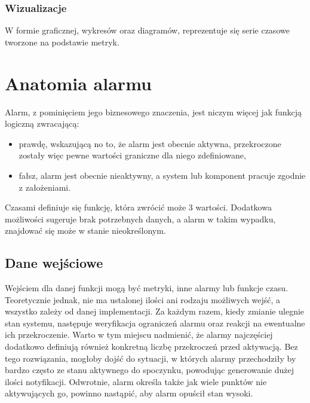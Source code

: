         \subsubsection{Wizualizacje}
        W formie graficznej, wykresów oraz diagramów, reprezentuje się serie czasowe tworzone na podstawie metryk.
    
\section{Anatomia alarmu}
\label{chapter:monitoring:anatomy_of_alarm}

    Alarm, z pominięciem jego biznesowego znaczenia, jest niczym więcej jak funkcją logiczną zwracającą:
    \begin{itemize}
        \item prawdę, wskazującą no to, że alarm jest obecnie aktywna, przekroczone zostały więc
        pewne wartości graniczne dla niego zdefiniowane,
        \item fałsz, alarm jest obecnie nieaktywny, a system lub komponent pracuje zgodnie z założeniami.
    \end{itemize}
    Czasami definiuje się funkcję, która zwrócić może 3 wartości. Dodatkowa możliwości sugeruje brak 
    potrzebnych danych, a alarm w takim wypadku, znajdować się może w stanie nieokreślonym. 
   
    \subsection{Dane wejściowe}
    Wejściem dla danej funkcji mogą być metryki, inne alarmy lub funkcje czasu. Teoretycznie jednak, nie ma ustalonej
    ilości ani rodzaju możliwych wejść, a wszystko zależy od danej implementacji. Za każdym razem, kiedy 
    zmianie ulegnie stan systemu, następuje weryfikacja ograniczeń alarmu oraz reakcji na ewentualne ich
    przekroczenie. Warto w tym miejscu nadmienić, że alarmy najczęściej dodatkowo definiują również 
    konkretną liczbę przekroczeń przed aktywacją. Bez tego rozwiązania, mogłoby dojść do sytuacji, w których
    alarmy przechodziły by bardzo często ze stanu aktywnego do spoczynku, powodując generowanie dużej ilości notyfikacji. Odwrotnie, alarm określa także jak wiele punktów nie aktywujących go, powinno
    nastąpić, aby alarm opuścił stan wysoki.
    
